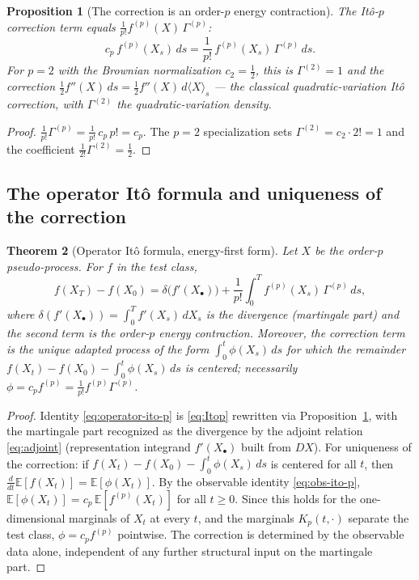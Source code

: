 \documentclass[11pt,reqno]{amsart}
\theoremstyle{plain}
\newtheorem{theorem}{Theorem}[section]
\newtheorem{proposition}[theorem]{Proposition}
\theoremstyle{definition}
\newcommand{\E}{\mathbb{E}}
\begin{document}
\begin{proposition}[The correction is an order-$p$ energy contraction]
\label{prop:carre-correction}
The It\^o-$p$ correction term equals $\tfrac{1}{p!}f^{(p)}(X)\,\Gamma^{(p)}$:
\begin{equation}
c_p\,f^{(p)}(X_s)\, ds = \frac{1}{p!}\,f^{(p)}(X_s)\,\Gamma^{(p)}\, ds.
\end{equation}
For $p=2$ with the Brownian normalization $c_2 = \tfrac12$, this is $\Gamma^{(2)} = 1$ and the correction $\tfrac12 f''(X)\,ds = \tfrac12 f''(X)\,d\langle X\rangle_s$ — the classical quadratic-variation It\^o correction, with $\Gamma^{(2)}$ the quadratic-variation density.
\end{proposition}

\begin{proof}
$\tfrac{1}{p!}\Gamma^{(p)} = \tfrac{1}{p!}\,c_p\,p! = c_p$. The $p=2$ specialization sets $\Gamma^{(2)} = c_2\cdot 2! = 1$ and the coefficient $\tfrac{1}{2!}\Gamma^{(2)} = \tfrac12$.
\end{proof}

\subsection{The operator It\^o formula and uniqueness of the correction}

\begin{theorem}[Operator It\^o formula, energy-first form]
\label{thm:operator-ito}
Let $X$ be the order-$p$ pseudo-process. For $f$ in the test class,
\begin{equation}
\label{eq:operator-ito-p}
f(X_T) - f(X_0) = \delta\bigl(f'(X_\bullet)\bigr) + \frac{1}{p!}\int_0^T f^{(p)}(X_s)\,\Gamma^{(p)}\, ds,
\end{equation}
where $\delta(f'(X_\bullet)) = \int_0^T f'(X_s)\,dX_s$ is the divergence (martingale part) and the second term is the order-$p$ energy contraction. Moreover, the correction term is the \emph{unique} adapted process of the form $\int_0^t \phi(X_s)\,ds$ for which the remainder $f(X_t) - f(X_0) - \int_0^t \phi(X_s)\,ds$ is centered; necessarily $\phi = c_p f^{(p)} = \tfrac{1}{p!}f^{(p)}\Gamma^{(p)}$.
\end{theorem}

\begin{proof}
Identity \eqref{eq:operator-ito-p} is \eqref{eq:Itop} rewritten via Proposition~\ref{prop:carre-correction}, with the martingale part recognized as the divergence by the adjoint relation \eqref{eq:adjoint} (representation integrand $f'(X_\bullet)$ built from $DX$). For uniqueness of the correction: if $f(X_t) - f(X_0) - \int_0^t \phi(X_s)\,ds$ is centered for all $t$, then $\tfrac{d}{dt}\E[f(X_t)] = \E[\phi(X_t)]$. By the observable identity \eqref{eq:obs-ito-p}, $\E[\phi(X_t)] = c_p\,\E[f^{(p)}(X_t)]$ for all $t \geq 0$. Since this holds for the one-dimensional marginals of $X_t$ at every $t$, and the marginals $K_p(t,\cdot)$ separate the test class, $\phi = c_p f^{(p)}$ pointwise. The correction is determined by the observable data alone, independent of any further structural input on the martingale part.
\end{proof}
\end{document}
